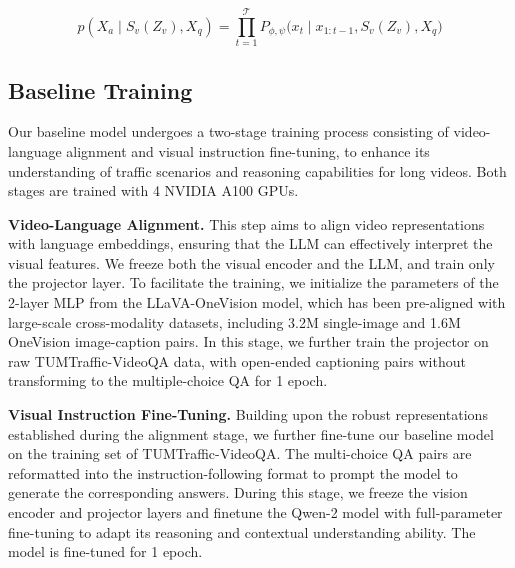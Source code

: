 {\small
\begin{equation}
p(X_a \mid S_v(Z_v), X_q) = \prod_{t=1}^{\mathcal{T}} P_{\phi,\psi}\big(x_t \mid x_{1:t-1}, S_v(Z_v), X_q)
\end{equation}}




\subsection{Baseline Training} Our baseline model undergoes a two-stage training process consisting of video-language alignment and visual instruction fine-tuning, to enhance its understanding of traffic scenarios and reasoning capabilities for long videos. Both stages are trained with 4 NVIDIA A100 GPUs. 

\noindent\textbf{Video-Language Alignment.} This step aims to align video representations with language embeddings, ensuring that the LLM can effectively interpret the visual features. We freeze both the visual encoder and the LLM, and train only the projector layer. To facilitate the training, we initialize the parameters of the 2-layer MLP from the LLaVA-OneVision model, which has been pre-aligned with large-scale cross-modality datasets, including 3.2M single-image and 1.6M OneVision image-caption pairs. In this stage, we further train the projector on raw TUMTraffic-VideoQA data, with open-ended captioning pairs without transforming to the multiple-choice QA for 1 epoch. 

\noindent\textbf{Visual Instruction Fine-Tuning.} Building upon the robust representations established during the alignment stage, we further fine-tune our baseline model on the training set of TUMTraffic-VideoQA. The multi-choice QA pairs are reformatted into the instruction-following format to prompt the model to generate the corresponding answers. During this stage, we freeze the vision encoder and projector layers and finetune the Qwen-2 model with full-parameter fine-tuning to adapt its reasoning and contextual understanding ability. The model is fine-tuned for 1 epoch.




